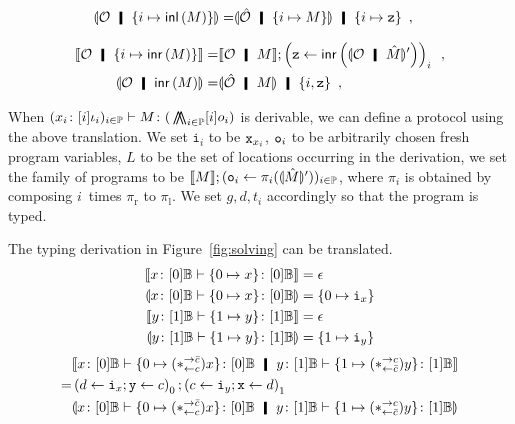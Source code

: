 {\begin{description}
\begin{align*}
 \semoi{\hypert\hmid \imapsto{\linl M}}=& \semoi{\hat \hypert\hmid
 \imapsto{M}}
 \hmid
 \{{i\mapsto \p z}\}\enspace,
\end{align*}
 \item[$\brac i\vee\intro_1$] 
\begin{align*}
 \semo{\hypert\hmid \imapsto{\linr M}} =& \semo{\hypert\hmid M};
 \left(\p z \leftarrow
 \linr{\semoi{\hypert\hmid\hat M}'}\right)_i\enspace, \\
 \semoi{\hypert\hmid \linr{M}}=& \semoi{\hat \hypert\hmid M}\hmid
 \{{i, \p z}\}\enspace,
\end{align*}
 \item[$\brac{i}\vee\elim$] 
\end{description}
When $({x_i} \colon{[i]\iota_i})_{i\in\mathbb{P}}
\vdash{M} \colon{(}\operatorname*{\bigwedge\kern -8pt \bigwedge}_{i\in \mathbb{P}}[i]o_i)$ is
derivable,
we can define a protocol using the above translation.
We set $\mathtt i_i$ to be ${\texttt{x}}_{x_i}$, ${\texttt{o}}_i$ to be arbitrarily
chosen fresh program variables, $L$ to be the set of locations
occurring in the derivation, we set the family of programs to be
$\llbracket{M}\rrbracket; ({\texttt{o}}_i\leftarrow \pi_i(\llparenthesis{\hat M}\rrparenthesis'))_{i\in\mathbb{P}}$,
where $\pi_i$ is obtained by composing $i$~times $\pi_{\mathrm r}$ to
$\pi_{\mathrm l}$.
We set $g,d,t_i$ accordingly so that the program is typed.
 \begin{example}
  The typing derivation in Figure~\ref{fig:solving} can be translated.
  \begin{align*}
   \llbracket{ {x} \colon{[0]\mathbb{B}} \vdash {\{0\mapsto x\}} \colon{[0]\mathbb{B}} }\rrbracket&= \epsilon\\
   \llparenthesis{ {x} \colon{[0]\mathbb{B}} \vdash {\{0\mapsto x\}} \colon{[0]\mathbb{B}} }\rrparenthesis &=
   \{0\mapsto \texttt{i}_x\} \\
   \llbracket{ {y} \colon{[1]\mathbb{B}} \vdash {\{1\mapsto y\}} \colon{[1]\mathbb{B}} }\rrbracket &=
   \epsilon\\
   \llparenthesis{ {y} \colon{[1]\mathbb{B}} \vdash {\{1\mapsto y\}} \colon{[1]\mathbb{B}} }\rrparenthesis &=
   \{1\mapsto \texttt{i}_y\}
  \end{align*}
  \begin{align*}
    &
   \semo{\tj{x}{[0]\bool}\tr\tj{\{0\mapsto (\comodL)x\}}{[0]\bool} \hmid
   \tj{y}{[1]\bool}\tr\tj{\{1\mapsto (\comodR)y\}}{[1]\bool}} \\
   =&
   \left(d\leftarrow\p i_x; \p y \leftarrow c\right)_0;
   \left(c\leftarrow\p i_y; \p x \leftarrow d\right)_1\\
   &\semoi{\tj{x}{[0]\bool}\tr\tj{\{0\mapsto (\comodL)x\}}{[0]\bool} \hmid
   \tj{y}{[1]\bool}\tr\tj{\{1\mapsto (\comodR)y\}}{[1]\bool}} \\

\end{align*}
\end{example}}
